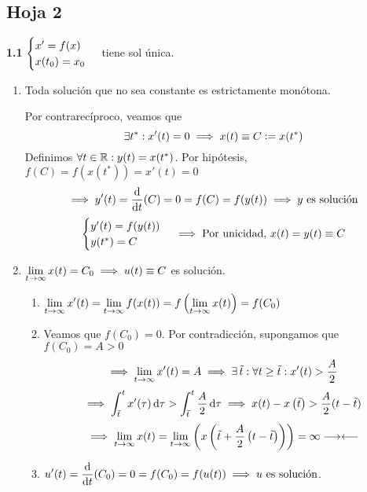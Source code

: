 \subsection{Hoja 2}

\textbf{1.1} $\displaystyle \begin{cases}
	x' = f(x) \\
	x(t_0) = x_0
\end{cases}$ tiene sol única.
\begin{enumerate}
	\item Toda solución que no sea constante es estrictamente monótona.
	\begin{dem}
		Por contrarecíproco, veamos que
		\[\displaystyle \exists t^* : x'(t)=0 \implies x(t)\equiv C\vcentcolon= x(t^*)\]
		Definimos $\forall t \in \mathbb{R}:y(t)=x(t^*)$. Por hipótesis, $f(C)=f(x(t^*))=x'(t)=0$
		\[\implies y'(t)=\odv{}{t}(C)=0=f(C)=f(y(t))\implies y \tex{ es solución}\]
		\[\begin{cases}
			y'(t)=f(y(t)) \\
			y(t^*)=C
		\end{cases} \implies \text{Por unicidad, } x(t)=y(t)\equiv C\]
	\end{dem}
	\item $\displaystyle \lim_{t\to \infty} x(t) = C_0 \implies u(t) \equiv C$ es solución.
	\begin{dem}
		\begin{enumerate}
			\item $\displaystyle \lim_{t\to \infty} x'(t)=\lim_{t\to \infty}f(x(t)) = f\left(\lim_{t\to \infty} x(t)\right) = f(C_0)$
			\item Veamos que $f(C_0)=0$. Por contradicción, supongamos que $f(C_0)=A>0$
			\[\implies \lim_{t\to \infty} x'(t)=A \implies \exists \, \tilde{t} : \forall t \geq \tilde{t} : x'(t)>\frac{A}{2}\]
			\[\implies \int_{\til{t}}^{t} x'(\tau) \odif{\tau} > \int_{\til{t}}^{t} \frac{A}{2} \odif{\tau} \implies x(t)-x\left(\til{t}\right)> \frac{A}{2}(t-\til{t})\]
			\[\implies \lim_{t\to\infty} x(t) = \lim_{t\to\infty}\left(x\left(\tilde{t}+\frac{A}{2}\left(t-\tilde{t}\right)\right)\right)=\infty \longrightarrow\longleftarrow\]
			\item $\ds u'(t) = \odv{}{t}(C_0)=0=f(C_0)=f(u(t)) \implies u \tex{ es solución}$.
		\end{enumerate}
	\end{dem}
\end{enumerate}

